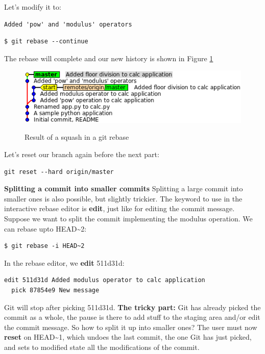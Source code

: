 \documentclass{../common/tufte-latex/tufte-handout}
\begin{document}
Let's modify it to:

\begin{lstlisting}[style=BashInputStyle]
Added 'pow' and 'modulus' operators
\end{lstlisting}

\begin{lstlisting}[style=BashInputStyle]
  $ git rebase --continue
\end{lstlisting}

The rebase will complete and our new history is shown in Figure \ref{fig:gitrebase-squash}

\begin{figure}%
  \centering
  \includegraphics[width=0.75\linewidth]{gitrebase-squash.png}
  \label{fig:gitrebase-squash}
  \caption{Result of a squash in a git rebase}
\end{figure}

Let's reset our branch again before the next part:

\begin{lstlisting}[style=BashInputStyle]
  git reset --hard origin/master
\end{lstlisting}

\noindent \textbf{Splitting a commit into smaller commits}
Splitting a large commit into smaller ones is also possible, but slightly trickier.
The keyword to use in the interactive rebase editor is \textbf{edit}, just like for editing the commit message.
Suppose we want to split the commit implementing the modulus operation.
We can rebase upto HEAD\textasciitilde2:

\begin{lstlisting}[style=BashInputStyle]
  $ git rebase -i HEAD~2
\end{lstlisting}

In the rebase editor, we \textbf{edit} 511d31d:
\begin{lstlisting}[style=BashInputStyle]
  edit 511d31d Added modulus operator to calc application
  pick 87854e9 New message
\end{lstlisting}

Git will stop after picking 511d31d.
\textbf{The tricky part:} Git has already picked the commit as a whole, the pause is there to add stuff to the staging area and/or edit the commit message.
So how to split it up into smaller ones?
The user must now \textbf{reset} on HEAD\textasciitilde1, which undoes the last commit, the one Git has just picked, and sets to modified state all the modifications of the commit.
\end{document}
